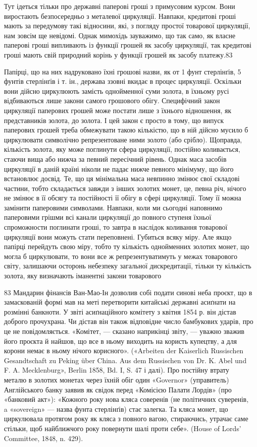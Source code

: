 Тут ідеться тільки про державні паперові гроші з примусовим
курсом. Вони виростають безпосередньо з металевої циркуляції.
Навпаки, кредитові гроші мають за передумову такі відносини,
які, з погляду простої товарової циркуляції, нам зовсім ще невідомі.
Однак мимохідь зауважимо, що так само, як власне паперові
гроші випливають із функції грошей як засобу циркуляції,
так кредитові гроші мають свій природний корінь у функції
грошей як засобу платежу.83

Папірці, що на них надруковано їхні грошові назви, як от
1 фунт стерлінґів, 5 фунтів стерлінґів і т. ін., держава ззовні
вкидає в процес циркуляції. Оскільки вони дійсно циркулюють
замість однойменної суми золота, в їхньому русі відбиваються
лише закони самого грошового обігу. Специфічний закон циркуляції
паперових грошей може постати лише з їхнього відношення,
як представників золота, до золота. І цей закон є просто в тому,
що випуск паперових грошей треба обмежувати такою кількістю,
що в ній дійсно мусило б циркулювати символічно репрезентоване
ними золото (або срібло). Щоправда, кількість золота, яку може
поглинути сфера циркуляції, постійно коливається, стаючи вища
або нижча за певний пересічний рівень. Однак маса засобів циркуляції
в даній країні ніколи не падає нижче певного мінімуму,
що його встановлює досвід. Те, що ця мінімальна маса невпинно
змінює свої складові частини, тобто складається завжди з інших
золотих монет, це, певна річ, нічого не змінює в її обсягу та постійності
її обігу в сфері циркуляції. Тому її можна замінити паперовими
символами. Навпаки, коли ми сьогодні наповнимо паперовими
грішми всі канали циркуляції до повного ступеня їхньої
спроможности поглинати гроші, то завтра в наслідок коливання
товарової циркуляції вони можуть стати переповнені. Губиться
всяку міру. Але якщо папірці перейдуть свою міру, тобто ту
кількість однойменних золотих монет, що могла б циркулювати,
то вони все ж репрезентуватимуть у межах товарового світу,
залишаючи осторонь небезпеку загальної дискредитації, тільки
ту кількість золота, яку визначають іманентні закони товарового

83 Мандарин фінансів Ван-Мао-Ін дозволив собі подати синові
неба проєкт, що в замаскованій формі мав на меті перетворити китайські
державні асиґнати на розмінні банкноти. У звіті асиґнаційного комітету
з квітня 1854 р. він дістав доброго прочухрана. Чи дістав він також відповідне
число бамбукових ударів, про це не повідомляється. «Комітет, —
сказано наприкінці звіту, — уважно зважив його проєкта й найшов, що
все в ньому виходить на користь купецтву, а для корони немає в ньому
нічого корисного». («Arbeiten der Kaiserlich Russischen Gesandtschaft zu
Peking über China. Aus dem Russischen von Dr. K. Abel und F. A. Mecklenburg»,
Berlin 1858, Bd. I, S. 47 і далі). Про постійну втрату металю в
золотих монетах через їхній обіг один «Governor» (управитель) Англійського
банку заявив як свідок перед «Комісією Палати Лордів» (про
«банковий акт»): «Кожного року нова кляса соверенів (не політичних
суверенів, a «sovereign» — назва фунта стерлінґів) стає залегка. Та кляса
монет, що циркулювала протягом року як кляса з повного вагою, стираючись,
утрачає саме стільки, щоб найближчого року повернути шалі
проти себе». (House of Lords’ Committee, 1848, n. 429).
